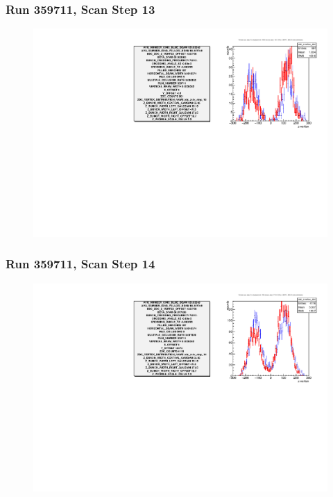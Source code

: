 \begin{frame}
\frametitle{Run 359711, Scan Step 13}
\begin{figure}
\begin{center}
\includegraphics[width=\linewidth]{"figs/359711_step_13_zdc_zvertex"}
\caption{ }
\label{fig:359711_step_13_zdc_zvertex}
\end{center}\end{figure}
\end{frame}

\begin{frame}
\frametitle{Run 359711, Scan Step 14}
\begin{figure}
\begin{center}
\includegraphics[width=\linewidth]{"figs/359711_step_14_zdc_zvertex"}
\caption{ }
\label{fig:359711_step_14_zdc_zvertex}
\end{center}\end{figure}
\end{frame}

